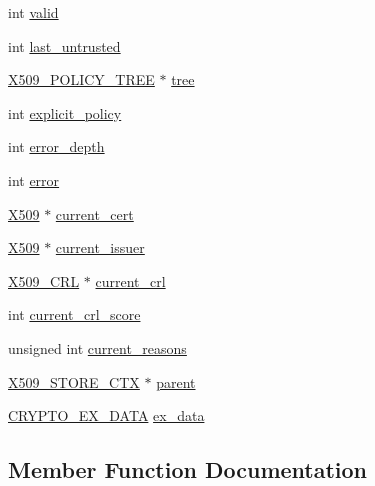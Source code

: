 \begin{DoxyCompactItemize}
\item 
int \hyperlink{structx509__store__ctx__st_ab8b4e8f74c47a32e46099ff8c4b66b7f}{valid}
\item 
int \hyperlink{structx509__store__ctx__st_ab269810ffeac1c116f7fabe0ba50690f}{last\+\_\+untrusted}
\item 
\hyperlink{ossl__typ_8h_a3be68a7c4cbbe4954ccd27ff7215cf0d}{X509\+\_\+\+P\+O\+L\+I\+C\+Y\+\_\+\+T\+R\+EE} $\ast$ \hyperlink{structx509__store__ctx__st_a4738c07151861b6f8836cdac1ab66464}{tree}
\item 
int \hyperlink{structx509__store__ctx__st_a428d424dc177abfdaa06d44a8951e495}{explicit\+\_\+policy}
\item 
int \hyperlink{structx509__store__ctx__st_a525adb8cc9af67d0094fccbd6eca4f4f}{error\+\_\+depth}
\item 
int \hyperlink{structx509__store__ctx__st_a02b3dadbb929845bcaeca254930386d1}{error}
\item 
\hyperlink{ossl__typ_8h_a4f666bde6518f95deb3050c54b408416}{X509} $\ast$ \hyperlink{structx509__store__ctx__st_adbbabe6efb4ed9745801ba73ac6e4f25}{current\+\_\+cert}
\item 
\hyperlink{ossl__typ_8h_a4f666bde6518f95deb3050c54b408416}{X509} $\ast$ \hyperlink{structx509__store__ctx__st_afbf0d2ac86354f35fb002a6326fca722}{current\+\_\+issuer}
\item 
\hyperlink{ossl__typ_8h_ac8661d2485c2c8da5fd7dd26b846f4bf}{X509\+\_\+\+C\+RL} $\ast$ \hyperlink{structx509__store__ctx__st_aeb5494eb4dec08c7ec0fbe9a79a23eff}{current\+\_\+crl}
\item 
int \hyperlink{structx509__store__ctx__st_a1cd61fb468f397eb179143f18664cfe3}{current\+\_\+crl\+\_\+score}
\item 
unsigned int \hyperlink{structx509__store__ctx__st_ae2ab9b215c63995eaef346e6a1fde845}{current\+\_\+reasons}
\item 
\hyperlink{ossl__typ_8h_ae681945a2cf88d6337137dc0260a1545}{X509\+\_\+\+S\+T\+O\+R\+E\+\_\+\+C\+TX} $\ast$ \hyperlink{structx509__store__ctx__st_a647b1547f675fde39774de2672fdbf69}{parent}
\item 
\hyperlink{ossl__typ_8h_a7eaff1c18057495d8af18f22d1370b51}{C\+R\+Y\+P\+T\+O\+\_\+\+E\+X\+\_\+\+D\+A\+TA} \hyperlink{structx509__store__ctx__st_a30a9b2bc4ea6479c2ce84b1a169cedd4}{ex\+\_\+data}
\end{DoxyCompactItemize}


\subsection{Member Function Documentation}

